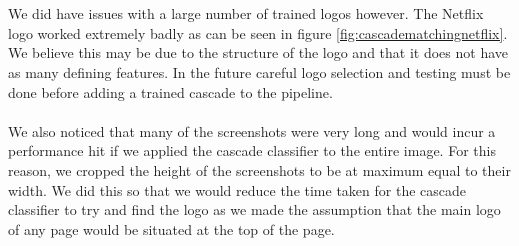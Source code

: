 \documentclass[12pt,twoside]{report}
\begin{document}
\\\\
We did have issues with a large number of trained logos however. The Netflix logo worked extremely badly as can be seen in figure \ref{fig:cascadematchingnetflix}. We believe this may be due to the structure of the logo and that it does not have as many defining features. In the future careful logo selection and testing must be done before adding a trained cascade to the pipeline.
\\\\
We also noticed that many of the screenshots were very long and would incur a performance hit if we applied the cascade classifier to the entire image. For this reason, we cropped the height of the screenshots to be at maximum equal to their width. We did this so that we would reduce the time taken for the cascade classifier to try and find the logo as we made the assumption that the main logo of any page would be situated at the top of the page.
\end{document}
